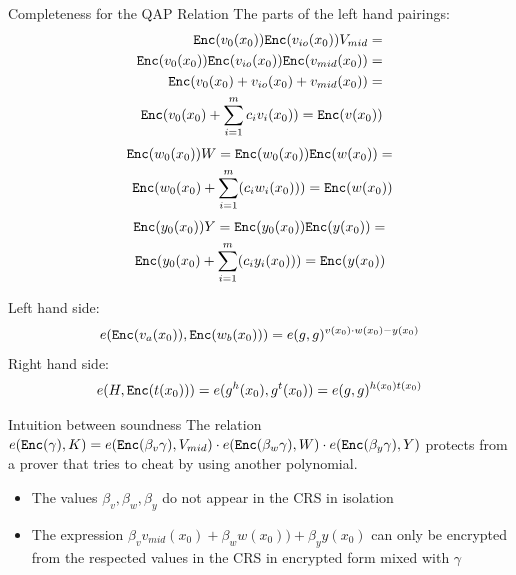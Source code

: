 \documentclass[handout]{beamer}
\begin{document}
\begin{frame}[allowframebreaks]{Completeness for the QAP Relation}
The parts of the left hand pairings:
\begin{align*}
\small
\mathtt{Enc}(v_0(x_0)) \mathtt{Enc}(v_{io}(x_0)) V_{mid} = \\
\mathtt{Enc}(v_0(x_0)) \mathtt{Enc}(v_{io}(x_0)) \mathtt{Enc}(v_{mid}(x_0)) = \\
\mathtt{Enc}(v_0(x_0) + v_{io}(x_0) + v_{mid}(x_0)) = \\ 
\mathtt{Enc}(v_0(x_0)+\sum_{i=1}^m c_i v_i(x_0)) = \mathtt{Enc}(v(x_0))
\end{align*}
\pause
\begin{align*}\small
\mathtt{Enc}(w_0(x_0))W= 
\mathtt{Enc}(w_0(x_0))\mathtt{Enc}(w(x_0))=\\
\mathtt{Enc}(w_0(x_0)+\sum_{i=1}^m(c_i w_i(x_0)))=\mathtt{Enc}(w(x_0))
\end{align*}
\pause
\begin{align*}\small
\mathtt{Enc}(y_0(x_0))Y= 
\mathtt{Enc}(y_0(x_0))\mathtt{Enc}(y(x_0))=\\
\mathtt{Enc}(y_0(x_0)+\sum_{i=1}^m(c_i y_i(x_0)))=\mathtt{Enc}(y(x_0))
\end{align*}

\framebreak
Left hand side:
\begin{align*}
e(\mathtt{Enc}(v_a(x_0)),\mathtt{Enc}(w_b(x_0)))=e(g,g)^{v(x_0) \cdot w(x_0) - y(x_0)}
\end{align*}
Right hand side:
\begin{align*}
e(H,\mathtt{Enc}(t(x_0)))=e(g^h(x_0),g^t(x_0))=e(g,g)^{h(x_0)t(x_0)}
\end{align*}
\end{frame}

\begin{frame}{Intuition between soundness}
The relation 
$e(\mathtt{Enc}(\gamma),K) = e(\mathtt{Enc}(\beta_v \gamma),V_{mid}) \cdot e(\mathtt{Enc}(\beta_w \gamma),W) \cdot e(\mathtt{Enc}(\beta_y \gamma),Y)$
protects from a prover that tries to cheat by using another polynomial. \pause
\begin{itemize}
    \item The values $\beta_v, \beta_w, \beta_y$ do not appear in the CRS in isolation \pause
    \item The expression $\beta_v v_{mid}(x_0) + \beta_w w(x_0))+\beta_y y(x_0) $ can only be encrypted from the respected values in the CRS in encrypted form mixed with $\gamma$ \pause
\end{itemize}
\end{frame}
\end{document}

